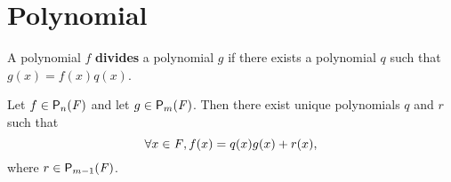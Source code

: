 \chapter{Polynomial}\label{ch:e}

\begin{defn}\label{e.0.1}
  A polynomial \(f\) \textbf{divides} a polynomial \(g\) if there exists a polynomial \(q\) such that \(g(x) = f(x) q(x)\).
\end{defn}

\begin{thm}\label{e.1}
  Let \(f \in \ps[n]{\F}\) and let \(g \in \ps[m]{\F}\).
  Then there exist unique polynomials \(q\) and \(r\) such that
  \begin{equation}\label{eq:e.0.1}
    \forall x \in \mathit{F}, f(x) = q(x) g(x) + r(x),
  \end{equation}
  where \(r \in \ps[m - 1]{\F}\).
\end{thm}

